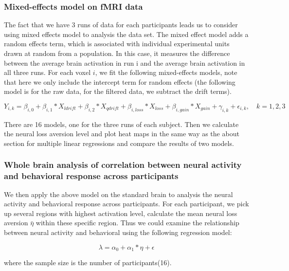 \documentclass[11pt]{article}
\begin{document}
\subsubsection{Mixed-effects model on fMRI data}

The fact that we have 3 runs of data for each participants leads us to consider 
using mixed effects model to analysis the data set. The mixed effect model adds 
a random effects term, which is associated with individual experimental units 
drawn at random from a population. In this case, it measures the difference 
between the average brain activation in run i and the 
average brain activation in all three runs. For each voxel $i$, we fit the 
following mixed-effects models, note that here we only include the intercept 
term for random effects (the following model is for the raw data, for the 
filtered data, we subtract the drift terms).

\begin{equation}
Y_{i, k} = \beta_{i, 0} + \beta_{i,1} *X_{ldrift} + \beta_{i, 2} * X_{qdrift} 
+  \beta_{i, loss} *X_{loss} + \beta_{i, gain} * X_{gain}  + \gamma _{i, k} 
+ \epsilon_{i, k}, \quad k =1, 2, 3
\end{equation}

There are 16 models, one for the three runs of each subject. Then we calculate 
the neural loss aversion level and plot heat maps in the same 
way as the about section for multiple linear regressions and compare the 
results of two models. 

\subsubsection{Whole brain analysis of correlation between 
neural activity and behavioral response across participants}

We then apply the above model on the standard brain to analysis the neural 
activity and behavioral response across participants. For each participant, 
we pick up several regions with highest activation level, calculate the mean 
neural loss aversion $\bar{\eta}$ within these specific region. Thus we could 
examine the relationship between neural activity and behavioral using the 
following regression model:

\begin{equation}
\lambda = \alpha_0 + \alpha_1 * \eta + \epsilon
\end{equation}

where the sample size is the number of participants(16). 
\end{document}
